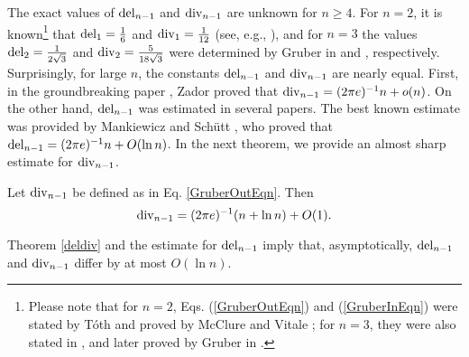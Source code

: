 The exact values of $\operatorname{del}_{n-1}$ and $\operatorname{div}_{n-1}$ are unknown for $ n \geq 4 $. For $ n=2$, it is known\footnote{Please note that for $n=2$, Eqs. (\ref{GruberOutEqn}) and (\ref{GruberInEqn})  were stated by T\'oth \cite{toth} and proved by McClure and Vitale \cite{McVi}; for $n=3$, they were also stated in \cite{toth}, and later proved by Gruber in \cite{GruberIn,GruberOut}.} that $\operatorname{del}_1=\frac{1}{6}$ and $\operatorname{div}_{1}=\frac{1}{12}$ (see, e.g., \cite{ludwig1999asymptotic}), and for $n=3$ the values  $\operatorname{del}_2=\frac{1}{2\sqrt{3}}$ and $\operatorname{div}_2=\frac{5}{18\sqrt{3}}$ were determined by Gruber in \cite{GruberIn} and \cite{GruberOut}, respectively. Surprisingly, for large $n$, the constants $\operatorname{del}_{n-1}$ and $\operatorname{div}_{n-1}$ are nearly equal. First,  in the groundbreaking paper \cite{zador1982asymptotic}, Zador proved that $\operatorname{div}_{n-1} =(2\pi e)^{-1}n +o(n)$.  On the other hand, $\operatorname{del}_{n-1}$ was estimated in several papers. The best known estimate was provided by Mankiewicz and Sch\"utt \cite{MaS1}, who proved that %
$\operatorname{del}_{n-1} = (2\pi e)^{-1}n + O(\ln n)$. In the next theorem, we provide an almost sharp estimate for $\operatorname{div}_{n-1}$. %

\begin{theorem}\label{deldiv}
	Let  $\operatorname{div}_{n-1} $  be defined as in Eq. \eqref{GruberOutEqn}. Then %
	\begin{equation}\label{deldiv2}
	\operatorname{div}_{n-1} = (2\pi e)^{-1}(n+\ln n)+O(1).
	\end{equation}
\end{theorem}

\noindent Theorem \ref{deldiv} and the estimate for $\operatorname{del}_{n-1}$ imply that, asymptotically, $ \operatorname{del}_{n-1} $ and $ \operatorname{div}_{n-1} $ differ by at most $O(\ln n)$.

\vskip 2mm
 
% 

 
